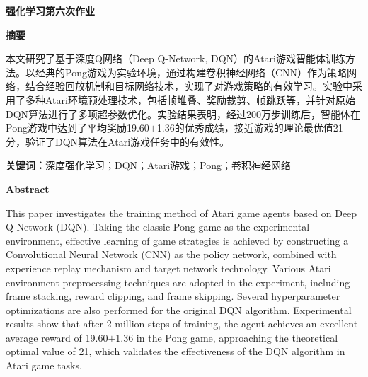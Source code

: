 \documentclass[12pt,a4paper]{article}
\begin{document}
\begin{center}
{\heiti\fontsize{22pt}{\baselineskip}\bfseries 强化学习第六次作业}
\end{center}

\vspace{1cm}

\begin{center}
{\heiti\fontsize{18pt}{\baselineskip}\bfseries 摘\quad 要}
\end{center}

\vspace{0.5cm}

\setlength{\parindent}{2em}
\setlength{\parskip}{0pt}
\setlength{\baselineskip}{20pt}

本文研究了基于深度Q网络（Deep Q-Network, DQN）的Atari游戏智能体训练方法。以经典的Pong游戏为实验环境，通过构建卷积神经网络（CNN）作为策略网络，结合经验回放机制和目标网络技术，实现了对游戏策略的有效学习。实验中采用了多种Atari环境预处理技术，包括帧堆叠、奖励裁剪、帧跳跃等，并针对原始DQN算法进行了多项超参数优化。实验结果表明，经过200万步训练后，智能体在Pong游戏中达到了平均奖励19.60$\pm$1.36的优秀成绩，接近游戏的理论最优值21分，验证了DQN算法在Atari游戏任务中的有效性。

\vspace{0.5cm}

\noindent\textbf{关键词：}深度强化学习；DQN；Atari游戏；Pong；卷积神经网络

\vspace{1cm}

\begin{center}
{\fontsize{18pt}{\baselineskip}\bfseries\selectfont Abstract}
\end{center}

\vspace{0.5cm}

This paper investigates the training method of Atari game agents based on Deep Q-Network (DQN). Taking the classic Pong game as the experimental environment, effective learning of game strategies is achieved by constructing a Convolutional Neural Network (CNN) as the policy network, combined with experience replay mechanism and target network technology. Various Atari environment preprocessing techniques are adopted in the experiment, including frame stacking, reward clipping, and frame skipping. Several hyperparameter optimizations are also performed for the original DQN algorithm. Experimental results show that after 2 million steps of training, the agent achieves an excellent average reward of 19.60$\pm$1.36 in the Pong game, approaching the theoretical optimal value of 21, which validates the effectiveness of the DQN algorithm in Atari game tasks.
\end{document}
